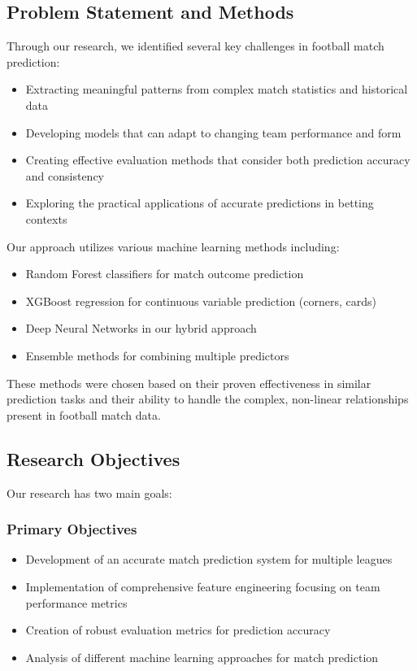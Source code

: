\documentclass[conference]{IEEEtran}
\begin{document}
\subsection{Problem Statement and Methods}
Through our research, we identified several key challenges in football match prediction:
\begin{itemize}
\item Extracting meaningful patterns from complex match statistics and historical data
\item Developing models that can adapt to changing team performance and form
\item Creating effective evaluation methods that consider both prediction accuracy and consistency
\item Exploring the practical applications of accurate predictions in betting contexts
\end{itemize}

Our approach utilizes various machine learning methods including:
\begin{itemize}
\item Random Forest classifiers for match outcome prediction
\item XGBoost regression for continuous variable prediction (corners, cards)
\item Deep Neural Networks in our hybrid approach
\item Ensemble methods for combining multiple predictors
\end{itemize}

These methods were chosen based on their proven effectiveness in similar prediction tasks and their ability to handle the complex, non-linear relationships present in football match data.

\subsection{Research Objectives}
Our research has two main goals:

\subsubsection{Primary Objectives}
\begin{itemize}
\item Development of an accurate match prediction system for multiple leagues
\item Implementation of comprehensive feature engineering focusing on team performance metrics
\item Creation of robust evaluation metrics for prediction accuracy
\item Analysis of different machine learning approaches for match prediction
\end{itemize}
\end{document}
